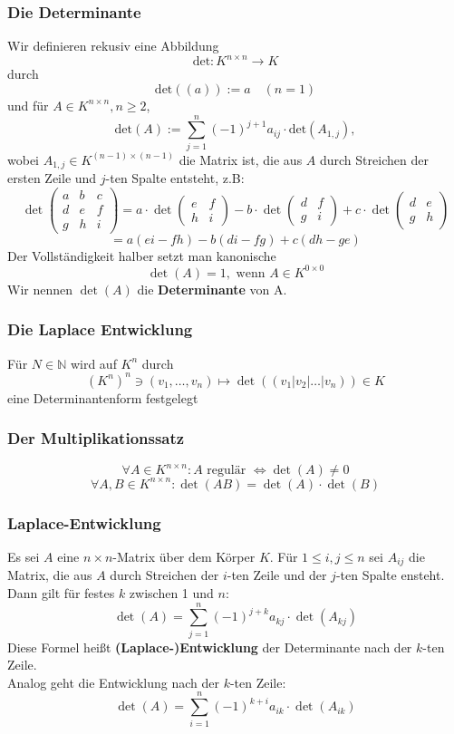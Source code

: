 \documentclass{kit}
\begin{document}
    \subsubsection{Die Determinante}
      Wir definieren rekusiv eine Abbildung
      $$\text{det}:K^{n\times n}\longrightarrow K$$
      durch
      $$\text{det}((a)):=a\quad(n=1)$$
      und für $A\in K^{n\times n},n\ge 2$,
      $$\text{det}(A):=\sum_{j=1}^n(-1)^{j+1}a_{ij}\cdot\text{det}(A_{1,j}),$$
      wobei $A_{1,j}\in K^{(n-1)\times(n-1)}$ die Matrix ist, die aus $A$ durch Streichen der ersten Zeile und $j$-ten Spalte entsteht, z.B:
      $$\det \begin{pmatrix}
        a & b & c\\
        d & e & f\\
        g & h & i 
        \end{pmatrix} = a\cdot\det\begin{pmatrix}
        e & f\\
        h & i
        \end{pmatrix}-b\cdot\det\begin{pmatrix}
        d & f\\
        g & i
      \end{pmatrix} + c\cdot\det\begin{pmatrix}
        d & e\\
        g & h
    \end{pmatrix}$$
    $$=a(ei-fh)-b(di-fg)+c(dh-ge)$$
    Der Vollständigkeit halber setzt man kanonische
    $$\det(A)=1,\text{ wenn }A\in K^{0\times0}$$
    Wir nennen $\det(A)$ die \textbf{Determinante} von A.
  \subsubsection{Die Laplace Entwicklung}
    Für $N\in\mathbb{N}$ wird auf $K^n$ durch
    $$(K^n)^n\ni(v_1,\dots,v_n)\mapsto\det((v_1|v_2|\dots|v_n))\in K$$
    eine Determinantenform festgelegt
  \subsubsection{Der Multiplikationssatz}
    $$\forall A\in K^{n\times n}:A\text{ regulär }\Leftrightarrow\det(A)\neq0$$
    $$\forall A,B\in K^{n\times n}:\det(AB)=\det(A)\cdot\det(B)$$
  \subsubsection{Laplace-Entwicklung}
    Es sei $A$ eine $n\times n$-Matrix über dem Körper $K$. Für $1\le i,j\le n$ sei $A_{ij}$ die Matrix, die aus $A$ durch Streichen der $i$-ten Zeile und der $j$-ten Spalte ensteht.
    Dann gilt für festes $k$ zwischen 1 und $n$:
    $$\det(A)=\sum_{j=1}^n(-1)^{j+k}a_{kj}\cdot\det(A_{kj})$$
    Diese Formel heißt \textbf{(Laplace-)Entwicklung} der Determinante nach der $k$-ten Zeile.\\
    Analog geht die Entwicklung nach der $k$-ten Zeile:
    $$\det(A)=\sum_{i=1}^n(-1)^{k+i}a_{ik}\cdot\det(A_{ik})$$
\end{document}
